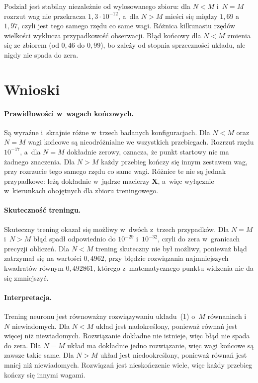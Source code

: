 \documentclass[12pt]{article}
\begin{document}
Podział jest stabilny niezależnie od wylosowanego zbioru: dla $N<M$ i~$N=M$ rozrzut
wag nie przekracza $1{,}3\cdot10^{-12}$, a~dla $N>M$ mieści się między $1{,}69$
a~$1{,}97$, czyli jest tego samego rzędu co same wagi. Różnica kilkunastu rzędów
wielkości wyklucza przypadkowość obserwacji. Błąd końcowy dla $N<M$ zmienia się ze
zbiorem (od $0{,}46$ do $0{,}99$), bo zależy od stopnia sprzeczności układu, ale
nigdy nie spada do zera.

\section{Wnioski}

\paragraph{Prawidłowości w~wagach końcowych.} Są wyraźne i~skrajnie różne w~trzech
badanych konfiguracjach. Dla $N<M$ oraz $N=M$ wagi końcowe są nieodróżnialne we
wszystkich przebiegach. Rozrzut rzędu $10^{-17}$, a~dla $N=M$ dokładnie zerowy, oznacza, że punkt startowy
nie ma żadnego znaczenia. Dla $N>M$ każdy przebieg kończy się innym
zestawem wag, przy rozrzucie tego samego rzędu co same wagi. Różnice te nie są
jednak przypadkowe: leżą dokładnie w~jądrze macierzy $\mathbf{X}$, a~więc wyłącznie
w~kierunkach obojętnych dla zbioru treningowego.

\paragraph{Skuteczność treningu.} Skuteczny trening okazał się możliwy w~dwóch
z~trzech przypadków. Dla $N=M$ i~$N>M$ błąd spadł odpowiednio do $10^{-29}$ i~$10^{-32}$, czyli do zera
w~granicach precyzji obliczeń. Dla $N<M$ trening
skuteczny nie był możliwy, ponieważ błąd zatrzymał się na wartości $0{,}4962$, przy błędzie rozwiązania najmniejszych
kwadratów równym $0{,}492861$, którego z~matematycznego punktu widzenia nie da się
zmniejszyć.

\paragraph{Interpretacja.} Trening neuronu jest równoważny rozwiązywaniu
układu~(1) o~$M$ równaniach i~$N$ niewiadomych. Dla $N<M$ układ jest nadokreślony,
ponieważ równań jest więcej niż niewiadomych. Rozwiązanie dokładne nie istnieje, więc
błąd nie spada do zera. Dla $N=M$ układ ma dokładnie jedno rozwiązanie, więc wagi
końcowe są zawsze takie same. Dla $N>M$ układ jest niedookreślony, ponieważ równań
jest mniej niż niewiadomych. Rozwiązań jest nieskończenie wiele, więc każdy przebieg
kończy się innymi wagami.
\end{document}
